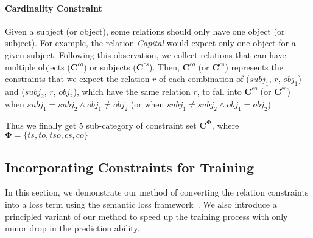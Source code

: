 
\paragraph{Cardinality Constraint}
Given a subject (or object), some relations should only have one object (or subject).
For example, the relation \emph{Capital} would expect only one object for a given subject.
Following this observation, we collect relations that can have multiple objects ($\bm{C}^{co}$) or subjects ($\bm{C}^{cs}$).
Then, $\bm{C}^{co}$ (or $\bm{C}^{cs}$) represents the constraints that we expect the relation $r$ of each combination of ($subj_1$, $r$, $obj_1$) and ($subj_2$, $r$, $obj_2$), which have the same relation $r$, to fall into $\bm{C}^{co}$ (or $\bm{C}^{cs}$) when $subj_1=subj_2 \land obj_1\neq obj_2$ (or when $subj_1\neq subj_2 \land obj_1=obj_2$)




Thus we finally get 5 sub-category of constraint set $\bm{C^{\Phi}}$, where $\bm{\Phi}=\{ts, to, tso, cs, co\}$

\subsection{Incorporating  Constraints for Training}
\label{sec:loss_term}
In this section, we demonstrate our method of converting the relation constraints into a loss term using the semantic loss framework~\cite{xu2017semantic}.
We also introduce a principled variant of our method to speed up the training process with only minor drop in the prediction ability.

